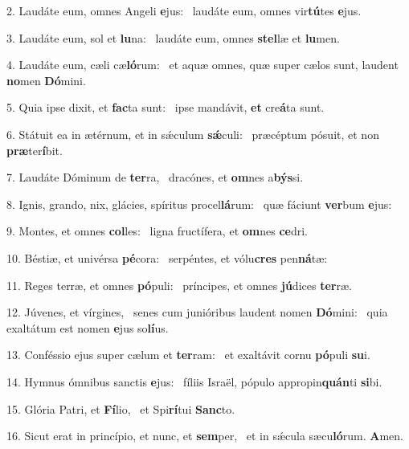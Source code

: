 2. Laudáte eum, omnes Angeli \textbf{e}jus: \ast\  laudáte eum, omnes vir\textbf{tú}tes \textbf{e}jus.\

3. Laudáte eum, sol et \textbf{lu}na: \ast\  laudáte eum, omnes \textbf{stel}læ et \textbf{lu}men.\

4. Laudáte eum, cæli cæ\textbf{ló}rum: \ast\  et aquæ omnes, quæ super cælos sunt, laudent \textbf{no}men \textbf{Dó}mini.\

5. Quia ipse dixit, et \textbf{fac}ta sunt: \ast\  ipse mandávit, \textbf{et} cre\textbf{á}ta sunt.\

6. Státuit ea in ætérnum, et in sǽculum \textbf{sǽ}culi: \ast\  præcéptum pósuit, et non \textbf{præ}ter\textbf{í}bit.\

7. Laudáte Dóminum de \textbf{ter}ra, \ast\  dracónes, et \textbf{om}nes a\textbf{býs}si.\

8. Ignis, grando, nix, glácies, spíritus procel\textbf{lá}rum: \ast\  quæ fáciunt \textbf{ver}bum \textbf{e}jus:\

9. Montes, et omnes \textbf{col}les: \ast\  ligna fructífera, et \textbf{om}nes \textbf{ce}dri.\

10. Béstiæ, et univérsa \textbf{pé}cora: \ast\  serpéntes, et vólu\textbf{cres} pen\textbf{ná}tæ:\

11. Reges terræ, et omnes \textbf{pó}puli: \ast\  príncipes, et omnes \textbf{jú}dices \textbf{ter}ræ.\

12. Júvenes, et vírgines, \dag\  senes cum junióribus laudent nomen \textbf{Dó}mini: \ast\  quia exaltátum est nomen \textbf{e}jus so\textbf{lí}us.\

13. Conféssio ejus super cælum et \textbf{ter}ram: \ast\  et exaltávit cornu \textbf{pó}puli \textbf{su}i.\

14. Hymnus ómnibus sanctis \textbf{e}jus: \ast\  fíliis Israël, pópulo appropin\textbf{quán}ti \textbf{si}bi.\

15. Glória Patri, et \textbf{Fí}lio, \ast\  et Spi\textbf{rí}tui \textbf{Sanc}to.\

16. Sicut erat in princípio, et nunc, et \textbf{sem}per, \ast\  et in sǽcula sæcu\textbf{ló}rum. \textbf{A}men.\

